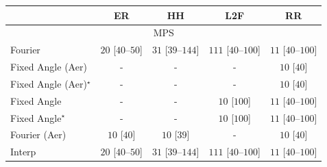 \begin{tabular}{l|cccc|}
\toprule
            & ER & HH & L2F & RR \\
\midrule
\multicolumn{5}{c}{\rule{0pt}{8pt}MPS} \\
\midrule
Fourier & {\cellcolor[HTML]{F5FBF2}} \color[HTML]{000000} $20$ [$40$--$50$] & {\cellcolor[HTML]{F2FAF0}} \color[HTML]{000000} $31$ [$39$--$144$] & {\cellcolor[HTML]{DEF2D9}} \color[HTML]{000000} $111$ [$40$--$100$] & {\cellcolor[HTML]{F7FCF5}} \color[HTML]{000000} $11$ [$40$--$100$] \\
Fixed Angle (Aer) & {\cellcolor[HTML]{000000}} \color[HTML]{F1F1F1} {\cellcolor{white}} \color{black} - & {\cellcolor[HTML]{000000}} \color[HTML]{F1F1F1} {\cellcolor{white}} \color{black} - & {\cellcolor[HTML]{000000}} \color[HTML]{F1F1F1} {\cellcolor{white}} \color{black} - & {\cellcolor[HTML]{F7FCF5}} \color[HTML]{000000} $10$ [$40$] \\
Fixed Angle (Aer)$^\star$ & {\cellcolor[HTML]{000000}} \color[HTML]{F1F1F1} {\cellcolor{white}} \color{black} - & {\cellcolor[HTML]{000000}} \color[HTML]{F1F1F1} {\cellcolor{white}} \color{black} - & {\cellcolor[HTML]{000000}} \color[HTML]{F1F1F1} {\cellcolor{white}} \color{black} - & {\cellcolor[HTML]{F7FCF5}} \color[HTML]{000000} $10$ [$40$] \\
Fixed Angle & {\cellcolor[HTML]{000000}} \color[HTML]{F1F1F1} {\cellcolor{white}} \color{black} - & {\cellcolor[HTML]{000000}} \color[HTML]{F1F1F1} {\cellcolor{white}} \color{black} - & {\cellcolor[HTML]{F7FCF5}} \color[HTML]{000000} $10$ [$100$] & {\cellcolor[HTML]{F7FCF5}} \color[HTML]{000000} $11$ [$40$--$100$] \\
Fixed Angle$^\star$ & {\cellcolor[HTML]{000000}} \color[HTML]{F1F1F1} {\cellcolor{white}} \color{black} - & {\cellcolor[HTML]{000000}} \color[HTML]{F1F1F1} {\cellcolor{white}} \color{black} - & {\cellcolor[HTML]{F7FCF5}} \color[HTML]{000000} $10$ [$100$] & {\cellcolor[HTML]{F7FCF5}} \color[HTML]{000000} $11$ [$40$--$100$] \\
Fourier (Aer) & {\cellcolor[HTML]{F7FCF5}} \color[HTML]{000000} $10$ [$40$] & {\cellcolor[HTML]{F7FCF5}} \color[HTML]{000000} $10$ [$39$] & {\cellcolor[HTML]{000000}} \color[HTML]{F1F1F1} {\cellcolor{white}} \color{black} - & {\cellcolor[HTML]{F7FCF5}} \color[HTML]{000000} $10$ [$40$] \\
Interp & {\cellcolor[HTML]{F5FBF2}} \color[HTML]{000000} $20$ [$40$--$50$] & {\cellcolor[HTML]{F2FAF0}} \color[HTML]{000000} $31$ [$39$--$144$] & {\cellcolor[HTML]{DEF2D9}} \color[HTML]{000000} $111$ [$40$--$100$] & {\cellcolor[HTML]{F7FCF5}} \color[HTML]{000000} $11$ [$40$--$100$] \\

\end{tabular}
